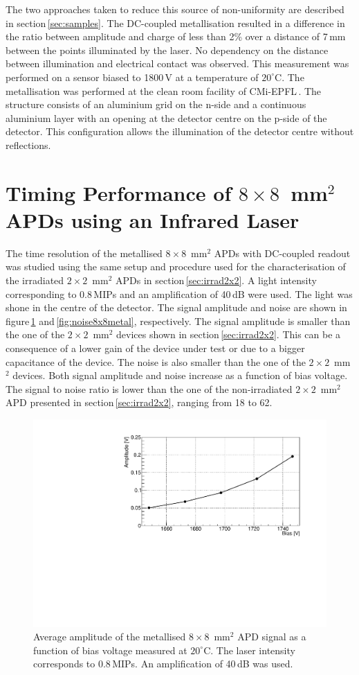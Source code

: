 \documentclass[review,number,sort&compress]{elsarticle}
\begin{document}
The two approaches taken to reduce this source of non-uniformity are described in section\,\ref{sec:samples}.
The DC-coupled metallisation resulted in a difference in the ratio between amplitude and charge of less than 2\% over a distance of 7\,mm between the points illuminated by the laser.
No dependency on the distance between illumination and electrical contact was observed.
This measurement was performed on a sensor biased to 1800\,V at a temperature of $20^\circ$C.
The metallisation was performed at the clean room facility of CMi-EPFL\,\cite{cmi}.
The structure consists of an aluminium grid on the n-side and a continuous aluminium layer with an opening at the detector centre on the p-side of the detector.
This configuration allows the illumination of the detector centre without reflections.

\section{Timing Performance of $8 \times 8$~mm$^2$ APDs using an Infrared Laser}
\label{sec:timing8x8laser}

The time resolution of the metallised $8 \times 8$~mm$^2$ APDs with DC-coupled readout was studied using the same setup and procedure used for the characterisation of the irradiated $2 \times 2$~mm$^2$ APDs in section\,\ref{sec:irrad2x2}.
A light intensity corresponding to 0.8\,MIPs and an amplification of 40\,dB were used.
The light was shone in the centre of the detector.
The signal amplitude and noise are shown in figure\,\ref{fig:ampli8x8metal} and\,\ref{fig:noise8x8metal}, respectively.
The signal amplitude is smaller than the one of the $2 \times 2$~mm$^2$ devices shown in section\,\ref{sec:irrad2x2}.
This can be a consequence of a lower gain of the device under test or due to a bigger capacitance of the device.
The noise is also smaller than the one of the $2 \times 2$~mm$^2$ devices.
Both signal amplitude and noise increase as a function of bias voltage.
The signal to noise ratio is lower than the one of the non-irradiated $2 \times 2$~mm$^2$ APD presented in section\,\ref{sec:irrad2x2}, ranging from 18 to 62.

\begin{figure}
  \centering
  \includegraphics[width = 0.6 \columnwidth]{ampli8x8metal}
  \caption{Average amplitude of the metallised $8 \times 8$~mm$^2$ APD signal as a function of bias voltage measured at $20^\circ$C. The laser intensity corresponds to 0.8\,MIPs. An amplification of 40\,dB was used.}
  \label{fig:ampli8x8metal}
\end{figure}
\end{document}
